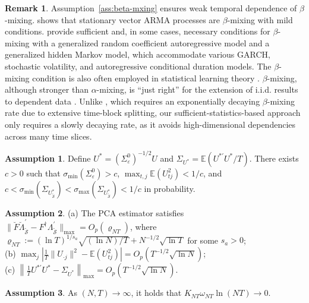 ﻿\documentclass[12pt]{article}
\newcommand{\0}{\mbox{\bf 0}}
\theoremstyle{plain}%
\newtheorem{remark}{Remark}
\theoremstyle{definition}
\newtheorem{assumption}{Assumption}
\newtheorem{remark}[theorem]{Remark}
\begin{document}
{\begin{remark}
    Assumption~\ref{ass:beta-mxing} ensures weak temporal dependence of $\beta$-mixing. \citet{Mokkadem1988} shows that stationary vector ARMA processes are $\beta$-mixing with mild conditions. \citet{CarrascoChen2002} provide sufficient and, in some cases, necessary conditions for $\beta$-mixing with a generalized random coefficient
autoregressive model and a generalized hidden Markov model, which accommodate various GARCH, stochastic volatility, and autoregressive conditional duration models. The $\beta$-mixing condition is also often employed in statistical learning theory  \citep{Vidyasagar2003,Lozano2005}. $\beta$-mixing, although stronger than $\alpha$-mixing, is ``just right'' for the extension of i.i.d. results to dependent data \citep[p.41]{Vidyasagar1997}. Unlike \citet{ChiFanIngLv2025}, which requires an exponentially decaying $\beta$-mixing rate due to extensive time-block splitting, our sufficient-statistics-based approach only requires a slowly decaying rate, as it avoids high-dimensional dependencies across many time slices.
\end{remark}

\begin{assumption}
\label{ass:bounded_moments}
Define $U^*=\left(\Sigma_{\varepsilon}^0\right)^{-1 / 2} U$ and $\Sigma_{U^*}=\mathbb{E}\left(U^{* \prime} U^* / T\right)$. There exists $c > 0$ such that $\sigma_{\min}(\Sigma_{\varepsilon}^0) > c$, $\max_{t,j} \mathbb{E}(U_{tj}^2) < 1/c$, and $c < \sigma_{\min}(\Sigma_{U_{\widetilde{\mathcal{S}}}^{\ast}}) < \sigma_{\max}(\Sigma_{U_{\widetilde{\mathcal{S}}}^{\ast}}) < 1/c$ in probability.
\end{assumption}

\begin{assumption}
\label{ass:high-level}
(a) The PCA estimator satisfies $\|\breve{F}\breve{\Lambda}_{\widetilde{\mathcal{S}}}^{\prime} - F^{\dagger} \Lambda_{\widetilde{\mathcal{S}}}^{\prime}\|_{\max} = O_p(\varrho_{NT})$, where $\varrho_{NT} := (\ln T)^{1/s_a} \sqrt{(\ln N)/T} + N^{-1/2} \sqrt{\ln T}$ for some $s_a > 0$; \\
(b) $\max_j \left| \frac{1}{T} \|U_{\cdot j}\|^2 - \mathbb{E}(U_{tj}^2) \right| = O_p(T^{-1/2} \sqrt{\ln N})$; \\
(c) $\left\| \frac{1}{T} U^{\ast \prime} U^{\ast} - \Sigma_{U^{\ast}} \right\|_{\max} = O_p(T^{-1/2} \sqrt{\ln N})$.
\end{assumption}

\begin{assumption}
\label{ass:rates}
As $(N, T) \to \infty$, it holds that $K_{NT} \omega_{NT} \ln(NT) \to 0$.
\end{assumption}

}
\end{document}
